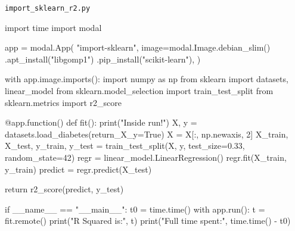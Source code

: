 \documentclass[
  letterpaper,
  DIV=11,
  numbers=noendperiod]{scrreprt}
\newenvironment{Shaded}{\begin{snugshade}}{\end{snugshade}}
\newcommand{\AttributeTok}[1]{\textcolor[rgb]{0.40,0.45,0.13}{#1}}
\newcommand{\BuiltInTok}[1]{\textcolor[rgb]{0.00,0.23,0.31}{#1}}
\newcommand{\ControlFlowTok}[1]{\textcolor[rgb]{0.00,0.23,0.31}{#1}}
\newcommand{\DecValTok}[1]{\textcolor[rgb]{0.68,0.00,0.00}{#1}}
\newcommand{\FloatTok}[1]{\textcolor[rgb]{0.68,0.00,0.00}{#1}}
\newcommand{\ImportTok}[1]{\textcolor[rgb]{0.00,0.46,0.62}{#1}}
\newcommand{\KeywordTok}[1]{\textcolor[rgb]{0.00,0.23,0.31}{#1}}
\newcommand{\NormalTok}[1]{\textcolor[rgb]{0.00,0.23,0.31}{#1}}
\newcommand{\OperatorTok}[1]{\textcolor[rgb]{0.37,0.37,0.37}{#1}}
\newcommand{\StringTok}[1]{\textcolor[rgb]{0.13,0.47,0.30}{#1}}
\newcommand{\VariableTok}[1]{\textcolor[rgb]{0.07,0.07,0.07}{#1}}
\begin{document}
\begin{codelisting}

\caption{\texttt{import_sklearn_r2.py}}

\begin{Shaded}
\begin{Highlighting}[]
\ImportTok{import}\NormalTok{ time}
\ImportTok{import}\NormalTok{ modal}

\NormalTok{app }\OperatorTok{=}\NormalTok{ modal.App(}
    \StringTok{"import{-}sklearn"}\NormalTok{,}
\NormalTok{    image}\OperatorTok{=}\NormalTok{modal.Image.debian\_slim()}
\NormalTok{    .apt\_install(}\StringTok{"libgomp1"}\NormalTok{)}
\NormalTok{    .pip\_install(}\StringTok{"scikit{-}learn"}\NormalTok{),}
\NormalTok{)}

\ControlFlowTok{with}\NormalTok{ app.image.imports():}
    \ImportTok{import}\NormalTok{ numpy }\ImportTok{as}\NormalTok{ np}
    \ImportTok{from}\NormalTok{ sklearn }\ImportTok{import}\NormalTok{ datasets, linear\_model}
    \ImportTok{from}\NormalTok{ sklearn.model\_selection }\ImportTok{import}\NormalTok{ train\_test\_split}
    \ImportTok{from}\NormalTok{ sklearn.metrics }\ImportTok{import}\NormalTok{ r2\_score}

\AttributeTok{@app.function}\NormalTok{()}
\KeywordTok{def}\NormalTok{ fit():}
    \BuiltInTok{print}\NormalTok{(}\StringTok{"Inside run!"}\NormalTok{)}
\NormalTok{    X, y }\OperatorTok{=}\NormalTok{ datasets.load\_diabetes(return\_X\_y}\OperatorTok{=}\VariableTok{True}\NormalTok{)}
\NormalTok{    X }\OperatorTok{=}\NormalTok{ X[:, np.newaxis, }\DecValTok{2}\NormalTok{]}
\NormalTok{    X\_train, X\_test, y\_train, y\_test }\OperatorTok{=}\NormalTok{ train\_test\_split(X, y, test\_size}\OperatorTok{=}\FloatTok{0.33}\NormalTok{, random\_state}\OperatorTok{=}\DecValTok{42}\NormalTok{)}
\NormalTok{    regr }\OperatorTok{=}\NormalTok{ linear\_model.LinearRegression()}
\NormalTok{    regr.fit(X\_train, y\_train)}
\NormalTok{    predict }\OperatorTok{=}\NormalTok{ regr.predict(X\_test)}
    
    \ControlFlowTok{return}\NormalTok{ r2\_score(predict, y\_test)}


\ControlFlowTok{if} \VariableTok{\_\_name\_\_} \OperatorTok{==} \StringTok{"\_\_main\_\_"}\NormalTok{:}
\NormalTok{    t0 }\OperatorTok{=}\NormalTok{ time.time()}
    \ControlFlowTok{with}\NormalTok{ app.run():}
\NormalTok{        t }\OperatorTok{=}\NormalTok{ fit.remote()}
        \BuiltInTok{print}\NormalTok{(}\StringTok{"R Squared is:"}\NormalTok{, t)}
    \BuiltInTok{print}\NormalTok{(}\StringTok{"Full time spent:"}\NormalTok{, time.time() }\OperatorTok{{-}}\NormalTok{ t0)}
\end{Highlighting}
\end{Shaded}

\end{codelisting}
\end{document}

